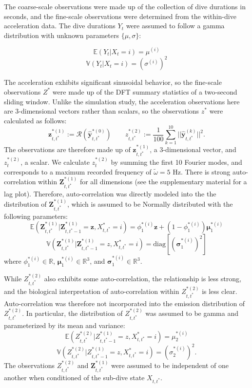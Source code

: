 The coarse-scale observations were made up of the collection of dive durations in seconds, and the fine-scale observations were determined from the within-dive acceleration data. The dive durations $Y_t$ were assumed to follow a gamma distribution with unknown parameters $\{\mu,\sigma\}$:

$$\mathbb{E}(Y_t|X_t = i) = \mu^{(i)}$$
$$\mathbb{V}(Y_t|X_t = i) = \left(\sigma^{(i)}\right)^2$$

The acceleration exhibits significant sinusoidal behavior, so the fine-scale observations $Z^*$ were made up of the DFT summary statistics of a two-second sliding window. Unlike the simulation study, the acceleration observations here are 3-dimensional vectors rather than scalars, so the observations $z^*$ were calculated as follows:
%
$$\mathbf{z}_{t,t^*}^{*(1)} := \mathcal{R}\left(\hat{\mathbf{y}}^{*(0)}_{t,t^*}\right) \qquad z_{t,t^*}^{*(2)} := \frac{1}{100}\sum_{k=1}^{10}||\hat{\mathbf{y}}^{(k)}_{t,t^*}||^2.$$
%
The observations are therefore made up of $\mathbf{z}_{t,t^*}^{*(1)}$, a 3-dimensional vector, and $z_t^{*(2)}$, a scalar. We calculate $z_t^{*(2)}$ by summing the first 10 Fourier modes, and corresponds to a maximum recorded frequency of $\tilde \omega = 5$ Hz. There is strong auto-correlation within $\mathbf{Z}^{*(1)}_{t,t^*}$ for all dimensions (see the supplementary material for a lag plot). Therefore, auto-correlation was directly modeled into the the distribution of $\mathbf{Z}^{*(1)}_{t,t^*}$, which is assumed to be Normally distributed with the following parameters:
%
$$\mathbb{E}(\mathbf{Z}^{*(1)}_{t,t^*}|\mathbf{Z}^{*(1)}_{t,t^*-1} = \mathbf{z}, X^*_{t,t^*} = i) = \phi_1^{*(i)} \mathbf{z} + (1-\phi_1^{*(i)}) \mathbf{\mu}_1^{*(i)}$$
$$\mathbb{V}(\mathbf{Z}^{*(1)}_{t,t^*}|\mathbf{Z}^{*(1)}_{t,t^*-1} = z,X^*_{t,t^*} = i) = \text{diag}\left[\left(\mathbf{\sigma}_1^{*(i)}\right)^2\right]$$
%
where $\phi_1^{*(i)} \in \mathbb{R}$, $\mathbf{\mu}_1^{*(i)} \in \mathbb{R}^3$, and $\mathbf{\sigma}_1^{*(i)} \in \mathbb{R}^3$.

While $Z^{*(2)}_{t,t^*}$ also exhibits some auto-correlation, the relationship is less strong, and the biological interpretation of auto-correlation within $Z^{*(2)}_{t,t^*}$ is less clear. Auto-correlation was therefore not incorporated into the emission distribution of $Z^{*(2)}_{t,t^*}$. In particular, the distribution of $Z^{*(2)}_{t,t^*}$ was assumed to be gamma and parameterized by its mean and variance:
%
$$\mathbb{E}(Z^{*(2)}_{t,t^*}|Z^{*(1)}_{t,t^*-1} = z,X^*_{t,t^*} = i) = \mu_2^{*(i)}$$
$$\mathbb{V}(Z^{*(2)}_{t,t^*}|Z^{*(1)}_{t,t^*-1} = z,X^*_{t,t^*} = i) = \left(\sigma_2^{*(i)}\right)^2.$$
%
The observations $Z^{*(2)}_{t,t^*}$ and $\mathbf{Z}^{*(1)}_{t,t^*}$ were assumed to be independent of one another when conditioned of the sub-dive state $X_{t,t^*}$.

